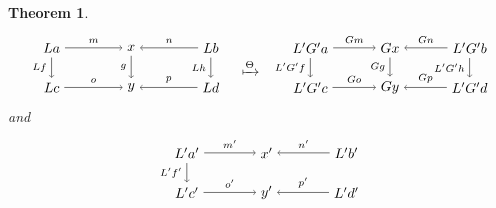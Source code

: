 \documentclass{amsart}
\newtheorem{theorem}{Theorem}[section]
\theoremstyle{remark}
\theoremstyle{definition}
\begin{document}
\begin{theorem}
\[\begin{tikzpicture}
      \begin{scope}
      \node (1) at (-2,1) {\( La \)};
      \node (2) at (0,1) {\( x \)};
      \node (3) at (2,1) {\( Lb \)};
      \node (4) at (-2,0) {\( Lc \)};
      \node (5) at (0,0) {\( y \)};
      \node (6) at (2,0) {\( Ld \)};
      \draw [->] (1) to node [above] {\scriptsize{\( m \)}} (2);
      \draw [->] (3) to node [above] {\scriptsize{\( n \)}} (2);
      \draw [->] (4) to node [above] {\scriptsize{\( o \)}} (5);
      \draw [->] (6) to node [above] {\scriptsize{\( p \)}} (5);
      \draw [->] (1) to node [left] {\scriptsize{\( Lf \)}} (4);
      \draw [->] (2) to node [left] {\scriptsize{\( g \)}} (5);
      \draw [->] (3) to node [left] {\scriptsize{\( Lh \)}} (6);
      \end{scope}
      \begin{scope}[shift={(3,0)}]
      \node (1) at (0,0.5) { $ \xmapsto{ \Theta } $ };
      \end{scope}
      \begin{scope}[shift={(6.5,0)}]
      \node (1) at (-2,1) {\( L'G'a \)};
      \node (2) at (0,1) {\( Gx \)};
      \node (3) at (2,1) {\( L'G'b \)};
      \node (4) at (-2,0) {\( L'G'c \)};
      \node (5) at (0,0) {\( Gy \)};
      \node (6) at (2,0) {\( L'G'd \)};
      \draw [->] (1) to node [above] {\scriptsize{\( Gm \)}} (2);
      \draw [->] (3) to node [above] {\scriptsize{\( Gn \)}} (2);
      \draw [->] (4) to node [above] {\scriptsize{\( Go \)}} (5);
      \draw [->] (6) to node [above] {\scriptsize{\( Gp \)}} (5);
      \draw [->] (1) to node [left] {\scriptsize{\( L'G'f \)}} (4);
      \draw [->] (2) to node [left] {\scriptsize{\( Gg \)}} (5);
      \draw [->] (3) to node [left] {\scriptsize{\( L'G'h \)}} (6);  
      \end{scope}
    \end{tikzpicture}
  \]
  and
  \[
    \begin{tikzpicture}
      \begin{scope}
      \node (1) at (-2,1) {\( L'a' \)};
      \node (2) at (0,1) {\( x' \)};
      \node (3) at (2,1) {\( L'b' \)};
      \node (4) at (-2,0) {\( L'c' \)};
      \node (5) at (0,0) {\( y' \)};
      \node (6) at (2,0) {\( L'd' \)};
      \draw [->] (1) to node [above] {\scriptsize{\( m' \)}} (2);
      \draw [->] (3) to node [above] {\scriptsize{\( n' \)}} (2);
      \draw [->] (4) to node [above] {\scriptsize{\( o' \)}} (5);
      \draw [->] (6) to node [above] {\scriptsize{\( p' \)}} (5);
      \draw [->] (1) to node [left] {\scriptsize{\( L'f' \)}} (4);

\end{scope}
\end{tikzpicture}\]
\end{theorem}
\end{document}
